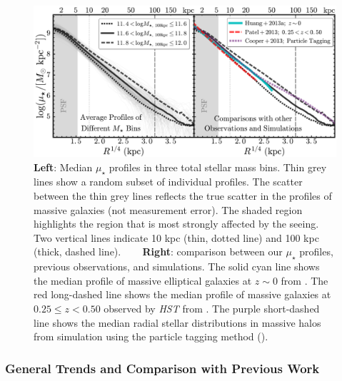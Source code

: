 \documentclass[a4paper,fleqn,usenatbib]{mnras}
\def\mden{{$\mu_{\star}$}}
\begin{document}
  \begin{figure}
      \centering 
      \includegraphics[width=\textwidth]{fig/average_mass_profiles_fsps1_A}
      \caption{
          \textbf{Left}: Median \mden{} profiles in three total stellar mass bins. 
              Thin grey lines show a random subset of individual profiles.  
              The scatter between the thin grey lines reflects the true scatter in 
              the profiles of massive galaxies (not measurement error). 
              The shaded region highlights the region that is most strongly affected 
              by the seeing. 
              Two vertical lines indicate 10 kpc (thin, dotted line) and
              100 kpc (thick, dashed line). ~~~ 
          \textbf{Right}: comparison between our \mden{} profiles, previous observations, 
              and simulations. 
              The solid cyan line shows the median profile of massive elliptical 
              galaxies at $z{\sim} 0$ from \citet[][]{Huang2013a}. 
              The red long-dashed line shows the median profile of massive galaxies at 
              $0.25 \leq z < 0.50$ observed by \textit{HST} from \citet[][]{Patel2013}. 
              The purple short-dashed line shows the median radial stellar distributions 
              in massive halos from simulation using the particle tagging method
              (\citealt{Cooper2013}).}
      \label{fig:avg_prof}
  \end{figure}


\subsubsection{General Trends and Comparison with Previous Work}
    \label{sssec:sbp_inter}
          
\end{document}
